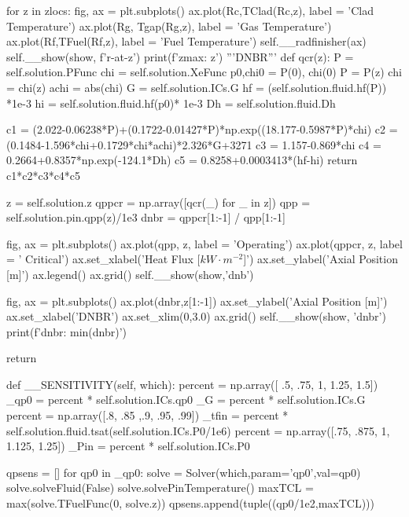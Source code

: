 \documentclass{article}
\begin{document}
\begin{python}
        for z in zlocs:
            fig, ax = plt.subplots()
            ax.plot(Rc,TClad(Rc,z), label = 'Clad Temperature')
            ax.plot(Rg, Tgap(Rg,z), label = 'Gas Temperature')
            ax.plot(Rf,TFuel(Rf,z), label = 'Fuel Temperature')
            self.__radfinisher(ax)
            self.__show(show, f'r-at-{z}')
        print(f'zmax: {z}')
        '''DNBR'''
        def qcr(z):
            P = self.solution.PFunc
            chi = self.solution.XeFunc
            p0,chi0 = P(0), chi(0)
            P = P(z)
            chi = chi(z)
            achi = abs(chi)
            G = self.solution.ICs.G
            hf = (self.solution.fluid.hf(P)) *1e-3
            hi = self.solution.fluid.hf(p0)* 1e-3
            Dh = self.solution.fluid.Dh

            c1 = (2.022-0.06238*P)+(0.1722-0.01427*P)*np.exp((18.177-0.5987*P)*chi)
            c2 = (0.1484-1.596*chi+0.1729*chi*achi)*2.326*G+3271
            c3 = 1.157-0.869*chi
            c4 = 0.2664+0.8357*np.exp(-124.1*Dh)
            c5 = 0.8258+0.0003413*(hf-hi)
            return c1*c2*c3*c4*c5
        
        z = self.solution.z
        qppcr = np.array([qcr(_) for _ in z])
        qpp = self.solution.pin.qpp(z)/1e3
        dnbr = qppcr[1:-1] / qpp[1:-1]

        fig, ax = plt.subplots()
        ax.plot(qpp, z, label = 'Operating')
        ax.plot(qppcr, z, label = ' Critical')
        ax.set_xlabel('Heat Flux  [$kW \cdot m^{-2}$]')
        ax.set_ylabel('Axial Position  [m]')
        ax.legend()
        ax.grid()
        self.__show(show,'dnb')

        fig, ax = plt.subplots()
        ax.plot(dnbr,z[1:-1])
        ax.set_ylabel('Axial Position  [m]')
        ax.set_xlabel('DNBR')
        ax.set_xlim(0,3.0)
        ax.grid()
        self.__show(show, 'dnbr')
        print(f'dnbr: {min(dnbr)}')

        return

    def __SENSITIVITY(self, which):
        percent = np.array([ .5, .75, 1, 1.25, 1.5])
        _qp0 = percent * self.solution.ICs.qp0
        _G = percent * self.solution.ICs.G
        percent = np.array([.8, .85 ,.9, .95, .99])
        _tfin =  percent * self.solution.fluid.tsat(self.solution.ICs.P0/1e6)
        percent = np.array([.75, .875, 1, 1.125, 1.25])
        _Pin = percent * self.solution.ICs.P0

        qpsens = []
        for qp0 in _qp0:
            solve = Solver(which,param='qp0',val=qp0)
            solve.solveFluid(False)
            solve.solvePinTemperature()
            maxTCL = max(solve.TFuelFunc(0, solve.z))
            qpsens.append(tuple((qp0/1e2,maxTCL)))
        

\end{python}
\end{document}
